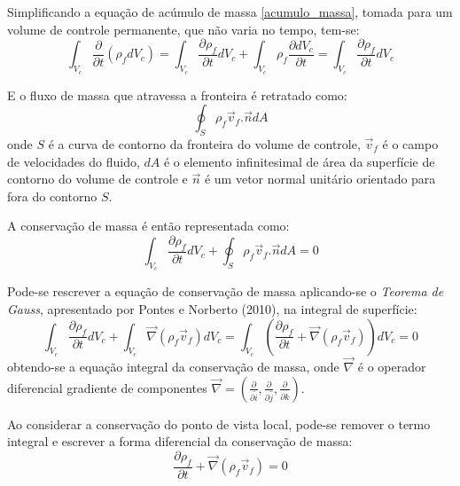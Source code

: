 Simplificando a equação de acúmulo de massa \eqref{acumulo_massa}, tomada para um volume de controle permanente, que não varia no tempo, tem-se:
\begin{equation}
    \int_{V_c}\dfrac{\partial}{\partial t} (\rho_f d V_c) = \int_{V_c}\dfrac{\partial \rho_f}{\partial t} d V_c + \int_{V_c} \rho_f \dfrac{\partial d V_c}{\partial t} = \int_{V_c}\dfrac{\partial \rho_f}{\partial t} d V_c
    \label{acumulo_massa_simp}
\end{equation}

E o fluxo de massa que atravessa a fronteira é retratado como:
\begin{equation}
    \oint_{S}\rho_f \vec{v}_f.\vec{n} dA
    \label{fluxo_massa}
\end{equation}
onde $S$ é a curva de contorno da fronteira do volume de controle, $\vec{v}_f$ é o campo de velocidades do fluido, $dA$ é o elemento infinitesimal de área da superfície de contorno do volume de controle e $\vec{n}$ é um vetor normal unitário orientado para fora do contorno $S$.

A conservação de massa é então representada como:
\begin{equation}
    \int_{V_c}\dfrac{\partial \rho_f}{\partial t} d V_c + \oint_{S}\rho_f \vec{v}_f.\vec{n} dA = 0
    \label{cons_mass}
\end{equation}

Pode-se rescrever a equação de conservação de massa aplicando-se o \textit{Teorema de Gauss}, apresentado por Pontes e Norberto (2010)\cite{pontes_norberto}, na integral de superfície:
\begin{equation}
    \int_{V_c}\dfrac{\partial \rho_f}{\partial t} d V_c + \int_{V_c}\vec{\nabla}(\rho_f \vec{v}_f) d V_c = 
    \int_{V_c}\left(\dfrac{\partial \rho_f}{\partial t} + \vec{\nabla}(\rho_f \vec{v}_f) \right)d V_c = 0
    \label{cons_mass_int}
\end{equation}
obtendo-se a equação integral da conservação de massa, onde $\vec{\nabla}$ é o operador diferencial gradiente de componentes $\vec{\nabla}=\left(\tfrac{\partial}{\partial \hat{i}}, \tfrac{\partial}{\partial \hat{j}}, \tfrac{\partial}{\partial \hat{k}}\right)$.

Ao considerar a conservação do ponto de vista local, pode-se remover o termo integral e escrever a forma diferencial da conservação de massa:
\begin{equation}
    \dfrac{\partial \rho_f}{\partial t} + \vec{\nabla}(\rho_f \vec{v}_f) = 0
    \label{cons_mass_dif}
\end{equation}

